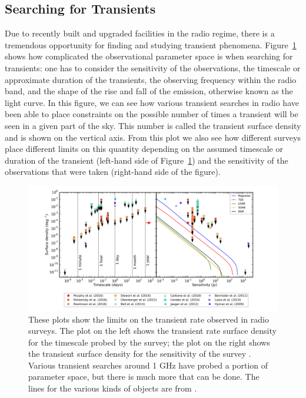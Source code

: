 \documentclass[12pt]{article}
\begin{document}
\subsection{Searching for Transients}

Due to recently built and upgraded facilities in the radio regime, there is a tremendous opportunity for finding and studying transient phenomena. Figure~\ref{murphy2017} \citep{2017MNRAS.466.1944M} shows how complicated the observational parameter space is when searching for transients: one has to consider the sensitivity of the observations, the timescale or approximate duration of the transients, the observing frequency within the radio band, and the shape of the rise and fall of the emission, otherwise known as the light curve. In this figure, we can see how various transient searches in radio have been able to place constraints on the possible number of times a transient will be seen in a given part of the sky. This number is called the transient surface density and is shown on the vertical axis. From this plot we also see how different surveys place different limits on this quantity depending on the assumed timescale or duration of the transient (left-hand side of Figure~\ref{murphy2017}) and the sensitivity of the observations that were taken (right-hand side of the figure). 

	\begin{figure}
		\includegraphics[width=\textwidth]{rates.png}
		\caption{These plots show the limits on the transient rate observed in radio surveys. The plot on the left shows the transient rate surface density for the timescale probed by the survey; the plot on the right shows the transient surface density for the sensitivity of the survey \citep{2017MNRAS.466.1944M}. Various transient searches around 1 GHz have probed a portion of parameter space, but there is much more that can be done. The lines for the various kinds of objects are from \citet{2015ApJ...806..224M}.}
		\label{murphy2017}
	\end{figure}
\end{document}
